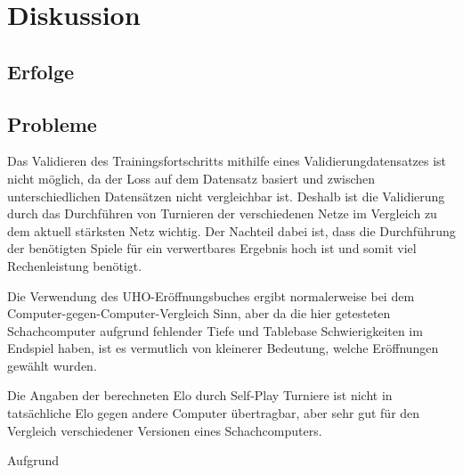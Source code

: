 \chapter{Diskussion}

\section{Erfolge}

\section{Probleme}

Das Validieren des Trainingsfortschritts mithilfe eines Validierungdatensatzes ist nicht möglich, da der Loss auf dem Datensatz basiert und zwischen unterschiedlichen Datensätzen nicht vergleichbar ist. Deshalb ist die Validierung durch das Durchführen von Turnieren der verschiedenen Netze im Vergleich zu dem aktuell stärksten Netz wichtig. Der Nachteil dabei ist, dass die Durchführung der benötigten Spiele für ein verwertbares Ergebnis hoch ist und somit viel Rechenleistung benötigt.

Die Verwendung des \ac{UHO}-Eröffnungsbuches ergibt normalerweise bei dem Computer-gegen-Computer-Vergleich Sinn, aber da die hier getesteten Schachcomputer aufgrund fehlender Tiefe und Tablebase Schwierigkeiten im Endspiel haben, ist es vermutlich von kleinerer Bedeutung, welche Eröffnungen gewählt wurden.

Die Angaben der berechneten Elo durch Self-Play Turniere ist nicht in tatsächliche Elo gegen andere Computer übertragbar, aber sehr gut für den Vergleich verschiedener Versionen eines Schachcomputers.

Aufgrund



